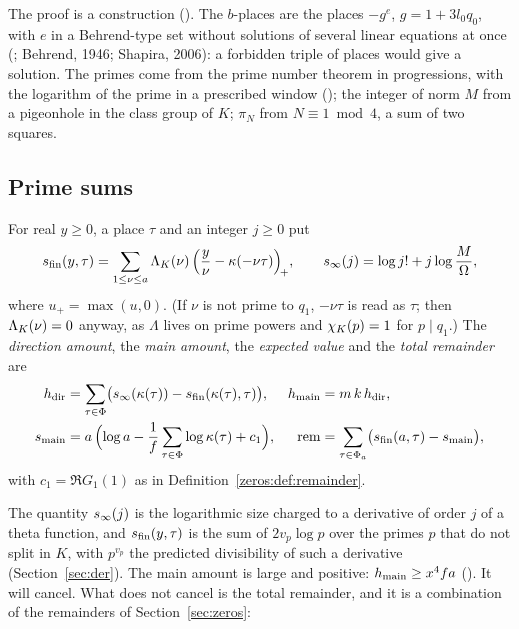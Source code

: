 The proof is a construction (). The $b$-places are the
places $-g^e$, $g = 1 + 3l_0q_0$, with $e$ in a Behrend-type set without solutions of several
linear equations at once (; Behrend, 1946; Shapira, 2006): a
forbidden triple of places would give a solution. The primes come from the prime number theorem in progressions, with the logarithm of
the prime in a prescribed window (); the integer of norm $M$ from a
pigeonhole in the class group of $K$; $\pi_N$ from $N \equiv 1 \bmod 4$, a sum of two squares.

\subsection{Prime sums}

\begin{definition}\label{setup:def:primesums}
For real $y \ge 0$, a place $\tau$ and an integer $j \ge 0$ put
\[
  s_{\mathrm{fin}}(y,\tau) = \sum_{1 \le \nu \le a} \Lambda_K(\nu)\,
     \Bigl( \frac{y}{\nu} - \kappa(-\nu\tau) \Bigr)_{\!+},
  \qquad
  s_\infty(j) = \log j! + j \log\frac{M}{\Omega},
\]
where $u_+ = \max(u,0)$. (If $\nu$ is not prime to $q_1$, $-\nu\tau$ is read as $\tau$; then
$\Lambda_K(\nu) = 0$ anyway, as $\Lambda$ lives on prime powers and $\chi_K(p) = 1$ for $p \mid q_1$.) The \emph{direction amount}, the \emph{main amount}, the \emph{expected value} and
the \emph{total remainder} are
\begin{align*}
  h_{\mathrm{dir}} &= \sum_{\tau \in \Phi} \bigl( s_\infty(\kappa(\tau)) - s_{\mathrm{fin}}(\kappa(\tau),\tau) \bigr),
  & h_{\mathrm{main}} &= m\,k\,h_{\mathrm{dir}}, \\
  s_{\mathrm{main}} &= a\,\Bigl( \log a - \frac1f \sum_{\tau\in\Phi} \log\kappa(\tau) + c_1 \Bigr),
  & \mathrm{rem} &= \sum_{\tau \in \Phi_a} \bigl( s_{\mathrm{fin}}(a,\tau) - s_{\mathrm{main}} \bigr),
\end{align*}
with $c_1 = \Re G_1(1)$ as in Definition~\ref{zeros:def:remainder}.
\end{definition}

The quantity $s_\infty(j)$ is the logarithmic size charged to a derivative of order $j$ of a theta
function, and $s_{\mathrm{fin}}(y,\tau)$ is the sum of $2v_p\log p$ over the primes $p$ that do not split in $K$,
with $p^{v_p}$ the predicted divisibility of such a derivative (Section~\ref{sec:der}). The main amount is
large and positive: $h_{\mathrm{main}} \ge x^4 f a$ (). It will cancel. What
does not cancel is the total remainder, and it is a combination of the remainders of
Section~\ref{sec:zeros}:

